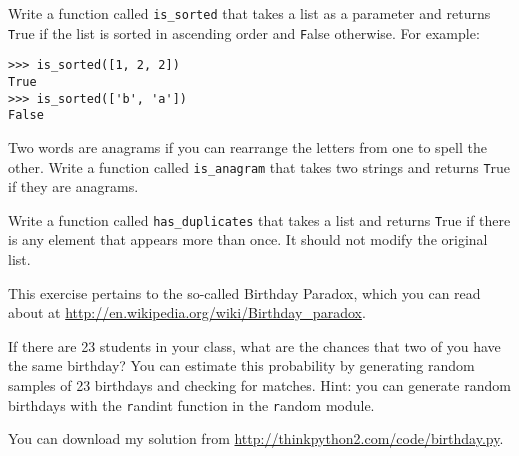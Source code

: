 \documentclass[
DIV=11,
fontsize=13,
twoside,
headinclude=false,
titlepage=firstiscover,
abstract=true,
headsepline=true,
footsepline=true,
chapterprefix=true, %
headings=big,
bibliography=totoc,%
captions=tableheading
]{scrbook}
\theoremstyle{definition}
\begin{document}
\begin{exercise}
\normalfont
Write a function called \verb"is_sorted" that takes a list as a
parameter and returns {\texttt True} if the list is sorted in ascending
order and {\texttt False} otherwise.  For example:

\begin{lstlisting}
>>> is_sorted([1, 2, 2])
True
>>> is_sorted(['b', 'a'])
False
\end{lstlisting}

\end{exercise}


\begin{exercise}
\normalfont
\label{anagram}

Two words are anagrams if you can rearrange the letters from one
to spell the other.  Write a function called \verb"is_anagram"
that takes two strings and returns {\texttt True} if they are anagrams.
\end{exercise}



\begin{exercise}
\normalfont
\label{duplicate}

Write a function called \verb"has_duplicates" that takes
a list and returns {\texttt True} if there is any element that
appears more than once.  It should not modify the original
list.

\end{exercise}


\begin{exercise}
\normalfont

This exercise pertains to the so-called Birthday Paradox, which you
can read about at \url{http://en.wikipedia.org/wiki/Birthday_paradox}.

If there are 23 students in your class, what are the chances
that two of you have the same birthday?  You can estimate this
probability by generating random samples of 23 birthdays
and checking for matches.  Hint: you can generate random birthdays
with the {\texttt randint} function in the {\texttt random} module.

You can download my
solution from \url{http://thinkpython2.com/code/birthday.py}.

\end{exercise}
\end{document}
